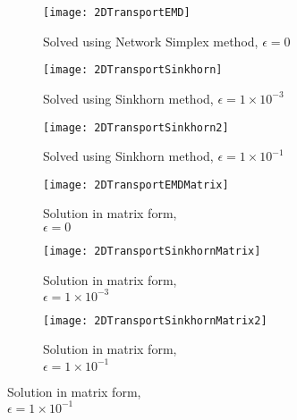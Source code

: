 \begin{figure}[H]
	\begin{center}
		\caption{Transportation for 2D data sets}
		\begin{subfigure}{0.32\textwidth}
			\caption{Solved using Network Simplex method, $\epsilon=0$}
			\texttt{[image: 2DTransportEMD]}
		\end{subfigure}
		\begin{subfigure}{0.32\textwidth}
			\caption{Solved using Sinkhorn method, $\epsilon=1\times 10^{-3}$}
			\texttt{[image: 2DTransportSinkhorn]}
		\end{subfigure}
		\begin{subfigure}{0.32\textwidth}
			\caption{Solved using Sinkhorn method, $\epsilon=1\times 10^{-1}$}
			\texttt{[image: 2DTransportSinkhorn2]}
		\end{subfigure}
		\begin{subfigure}{0.32\textwidth}
			\caption{Solution in matrix form,\\ $\epsilon=0$}
			\texttt{[image: 2DTransportEMDMatrix]}
		\end{subfigure}
		\begin{subfigure}{0.32\textwidth}
				\caption{Solution in matrix form,\\ $\epsilon=1\times 10^{-3}$}
			\texttt{[image: 2DTransportSinkhornMatrix]}
		\end{subfigure}
		\begin{subfigure}{0.32\textwidth}
				\caption{Solution in matrix form,\\ $\epsilon=1\times 10^{-1}$}
			\texttt{[image: 2DTransportSinkhornMatrix2]}
		\end{subfigure}
		\label{fig: 2D Transport.}
	\end{center}
\end{figure}
